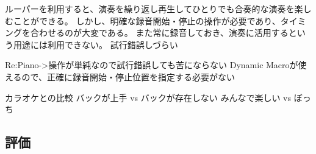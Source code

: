 
ルーパーを利用すると、演奏を繰り返し再生してひとりでも合奏的な演奏を楽しむことができる。
しかし、明確な録音開始・停止の操作が必要であり、タイミングを合わせるのが大変である。
また常に録音しておき、演奏に活用するという用途には利用できない。
試行錯誤しづらい


Re:Piano->操作が単純なので試行錯誤しても苦にならない
Dynamic Macroが使えるので、正確に録音開始・停止位置を指定する必要がない

カラオケとの比較
バックが上手 vs バックが存在しない
みんなで楽しい vs ぼっち

\subsection{評価}

